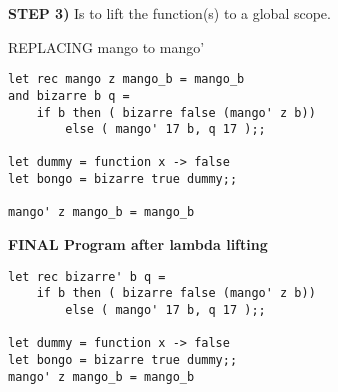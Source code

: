 \noindent \textbf{STEP 3)} Is to lift the function(s) to a global scope.

REPLACING mango to mango'
\begin{verbatim}
let rec mango z mango_b = mango_b
and bizarre b q =
    if b then ( bizarre false (mango' z b))
        else ( mango' 17 b, q 17 );;

let dummy = function x -> false
let bongo = bizarre true dummy;;

mango' z mango_b = mango_b
\end{verbatim}
\newpage
\noindent \textbf{FINAL Program after lambda lifting}
\begin{verbatim}
let rec bizarre' b q =
    if b then ( bizarre false (mango' z b))
        else ( mango' 17 b, q 17 );;

let dummy = function x -> false
let bongo = bizarre true dummy;;
mango' z mango_b = mango_b
\end{verbatim}

\newpage